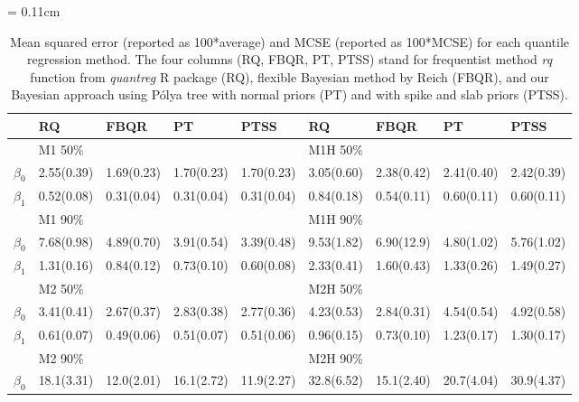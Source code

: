 \documentclass[12pt]{article}
\newcommand{\polya}{P\'{o}lya}
\begin{document}
\begin{center}
  \begin{table}[h]
    \centering
    \caption[]{ Mean squared error (reported as 100*average) and MCSE
      (reported as 100*MCSE) for each
      quantile regression method.   The four
      columns (RQ, FBQR,
      PT, PTSS) stand for frequentist method \textit{rq} function from
      \textit{quantreg} R package (RQ), flexible Bayesian method by Reich (FBQR), and
      our Bayesian approach using \polya{} tree with normal priors (PT) and with
      spike and slab priors (PTSS).}
    \vspace{4mm}
    \tabcolsep = 0.11cm
    \begin{tabular}[tb]{c|llll|llll}
      \hline
                & RQ         & FBQR       & PT         & PTSS       & RQ         & FBQR       & PT         & PTSS       \\
      \hline
                & M1 50\%    &            &            &            & M1H 50\%   &            &            &            \\
      $\beta_0$ & 2.55(0.39) & 1.69(0.23) & 1.70(0.23) & 1.70(0.23) & 3.05(0.60) & 2.38(0.42) & 2.41(0.40) & 2.42(0.39) \\
      $\beta_1$ & 0.52(0.08) & 0.31(0.04) & 0.31(0.04) & 0.31(0.04) & 0.84(0.18) & 0.54(0.11) & 0.60(0.11) & 0.60(0.11) \\
                & M1 90\%    &            &            &            & M1H 90\%   &            &            &            \\
      $\beta_0$ & 7.68(0.98) & 4.89(0.70) & 3.91(0.54) & 3.39(0.48) & 9.53(1.82) & 6.90(12.9) & 4.80(1.02) & 5.76(1.02) \\
      $\beta_1$ & 1.31(0.16) & 0.84(0.12) & 0.73(0.10) & 0.60(0.08) & 2.33(0.41) & 1.60(0.43) & 1.33(0.26) & 1.49(0.27) \\
      \hline
                & M2 50\%    &            &            &            & M2H 50\%   &            &            &            \\
      $\beta_0$ & 3.41(0.41) & 2.67(0.37) & 2.83(0.38) & 2.77(0.36) & 4.23(0.53) & 2.84(0.31) & 4.54(0.54) & 4.92(0.58) \\
      $\beta_1$ & 0.61(0.07) & 0.49(0.06) & 0.51(0.07) & 0.51(0.06) & 0.96(0.15) & 0.73(0.10) & 1.23(0.17) & 1.30(0.17) \\
                & M2 90\%    &            &            &            & M2H 90\%   &            &            &            \\
      $\beta_0$ & 18.1(3.31) & 12.0(2.01) & 16.1(2.72) & 11.9(2.27) & 32.8(6.52) & 15.1(2.40) & 20.7(4.04) & 30.9(4.37) \\

\end{tabular}
\end{table}
\end{center}
\end{document}
